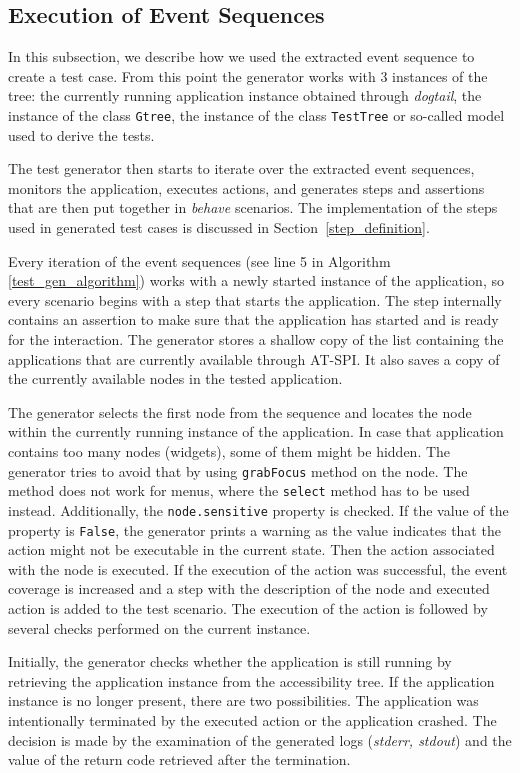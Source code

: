 \subsection{Execution of Event Sequences}\label{testing}
In this subsection, we describe how we used the extracted event sequence to create a test case. From this point the generator works with 3 instances of the tree: the currently running application instance obtained through \textit{dogtail}, the instance of the class \texttt{Gtree}, the instance of the class \texttt{TestTree} or so-called model used to derive the tests.


The test generator then starts to iterate over the extracted event sequences, monitors the application, executes actions, and generates steps and assertions that are then put together in \textit{behave} scenarios. The implementation of the steps used in generated test cases is discussed in Section~\ref{step_definition}.

Every iteration of the event sequences (see line 5 in Algorithm \ref{test_gen_algorithm}) works with a newly started instance of the application, so every scenario begins with a step that starts the application. The step internally contains an assertion to make sure that the application has started and is ready for the interaction. The generator stores a shallow copy of the list containing the applications that are currently available through AT-SPI. It also saves a copy of the currently available nodes in the tested application. 

The generator selects the first node from the sequence and locates the node within the currently running instance of the application. In case that application contains too many nodes (widgets), some of them might be hidden. The generator tries to avoid that by using \texttt{grabFocus} method on the node. The method does not work for menus, where the \texttt{select} method has to be used instead.  Additionally, the \texttt{node.sensitive} property is checked. If the value of the property is \texttt{False}, the generator prints a warning as the value indicates that the action might not be executable in the current state. Then the action associated with the node is executed. If the execution of the action was successful, the event coverage is increased and a step with the description of the node and executed action is added to the test scenario. The execution of the action is followed by several checks performed on the current instance.

Initially, the generator checks whether the application is still running by retrieving the application instance from the accessibility tree. If the application instance is no longer present, there are two possibilities. The application was intentionally terminated by the executed action or the application crashed. The decision is made by the examination of the generated logs (\textit{stderr, stdout}) and the value of the return code retrieved after the termination.

